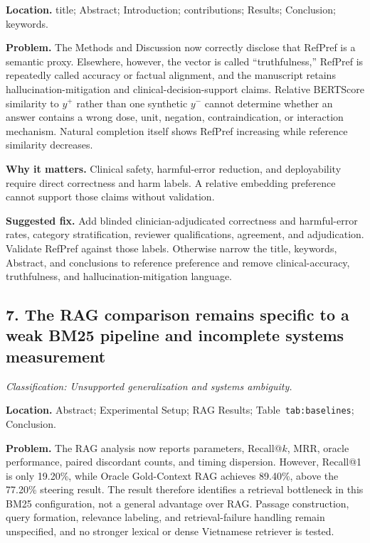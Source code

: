 \documentclass[11pt]{article}
\newcommand{\findinglabel}[1]{\textbf{#1}}
\newcommand{\classification}[1]{\textit{Classification: #1.}}
\begin{document}
\findinglabel{Location.} title; Abstract; Introduction; contributions; Results; Conclusion; keywords.

\findinglabel{Problem.} The Methods and Discussion now correctly disclose that RefPref is a semantic proxy.  Elsewhere, however, the vector is called ``truthfulness,'' RefPref is repeatedly called accuracy or factual alignment, and the manuscript retains hallucination-mitigation and clinical-decision-support claims.  Relative BERTScore similarity to $y^+$ rather than one synthetic $y^-$ cannot determine whether an answer contains a wrong dose, unit, negation, contraindication, or interaction mechanism.  Natural completion itself shows RefPref increasing while reference similarity decreases.

\findinglabel{Why it matters.} Clinical safety, harmful-error reduction, and deployability require direct correctness and harm labels.  A relative embedding preference cannot support those claims without validation.

\findinglabel{Suggested fix.} Add blinded clinician-adjudicated correctness and harmful-error rates, category stratification, reviewer qualifications, agreement, and adjudication.  Validate RefPref against those labels.  Otherwise narrow the title, keywords, Abstract, and conclusions to reference preference and remove clinical-accuracy, truthfulness, and hallucination-mitigation language.

\subsection*{7. The RAG comparison remains specific to a weak BM25 pipeline and incomplete systems measurement}

\classification{Unsupported generalization and systems ambiguity}

\findinglabel{Location.} Abstract; Experimental Setup; RAG Results; Table~\texttt{tab:baselines}; Conclusion.

\findinglabel{Problem.} The RAG analysis now reports parameters, Recall@$k$, MRR, oracle performance, paired discordant counts, and timing dispersion.  However, Recall@1 is only 19.20\%, while Oracle Gold-Context RAG achieves 89.40\%, above the 77.20\% steering result.  The result therefore identifies a retrieval bottleneck in this BM25 configuration, not a general advantage over RAG.  Passage construction, query formation, relevance labeling, and retrieval-failure handling remain unspecified, and no stronger lexical or dense Vietnamese retriever is tested.
\end{document}
